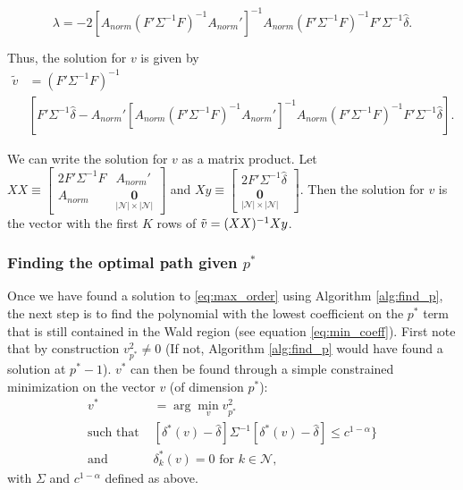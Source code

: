 \documentclass[12pt]{article}
\begin{document}
\begin{equation*}
\lambda = -2[A_{norm}(F'\Sigma^{-1}F)^{-1}A_{norm}']^{-1}A_{norm}(F'\Sigma^{-1}F)^{-1} F' \Sigma^{-1} \widehat{\delta}.
\end{equation*}

Thus, the solution for $v$ is given by
\begin{align*}
\tilde v &= (F'\Sigma^{-1}F)^{-1} \\
& \left[ F' \Sigma^{-1} \widehat{\delta} - A_{norm}'[A_{norm}(F'\Sigma^{-1}F)^{-1}A_{norm}']^{-1}
A_{norm} (F'\Sigma^{-1}F)^{-1}F' \Sigma^{-1} \widehat{\delta}\right].
\end{align*}

We can write the solution for $v$ as a matrix product. Let $XX \equiv \begin{bmatrix} 2F'\Sigma^{-1}F & A_{norm}' \\ A_{norm} & \underset{|\mathcal{N}| \times |\mathcal{N}|} {\mathbf{0}} \end{bmatrix} $ and $Xy \equiv \begin{bmatrix} 2F'\Sigma^{-1}\widehat{\delta} \\ \underset{|\mathcal{N}| \times |\mathcal{N}|}{\mathbf{0}} \end{bmatrix} $. Then the solution for $v$ is the vector with the first $K$ rows of $\Tilde{v} = (XX)^{-1} Xy$.

\subsubsection{Finding the optimal path given $p^*$}


Once we have found a solution to \eqref{eq:max_order} using Algorithm \ref{alg:find_p}, the next step is to find the polynomial with the lowest coefficient on the $p^*$ term that is still contained in the Wald region (see equation \ref{eq:min_coeff}).
First note that by construction $v^2_{p^*} \ne 0$ (If not, Algorithm \ref{alg:find_p} would have found a solution at $p^*-1$). $v^*$ can then be found through a simple constrained minimization on the vector $v$ (of dimension $p^*$):
\begin{align}
v^* &= \arg\min_{v} v_{p^*}^2 \label{eq:obj}\\
\text{such that }  & [\delta^*(v)-\widehat{\delta}]\Sigma^{-1}[\delta^*(v)-\widehat{\delta}] \le c^{1-\alpha}\} \label{eq:cons1}\\
\text{and } & \delta_{k}^*(v)=0 \text{ for } k \in \mathcal{N}, \label{eq:cons2}
\end{align}
with $\Sigma$ and $c^{1-\alpha}$ defined as above.
\end{document}
